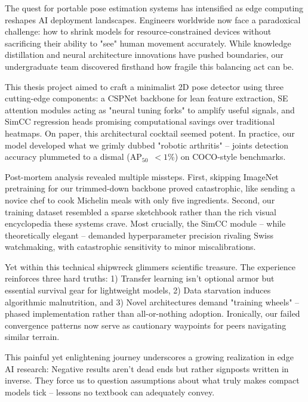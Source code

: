 The quest for portable pose estimation systems has intensified as edge computing reshapes AI deployment landscapes. Engineers worldwide now face a paradoxical challenge: how to shrink models for resource-constrained devices without sacrificing their ability to "see" human movement accurately. While knowledge distillation and neural architecture innovations have pushed boundaries, our undergraduate team discovered firsthand how fragile this balancing act can be.

This thesis project aimed to craft a minimalist 2D pose detector using three cutting-edge components: a CSPNet backbone for lean feature extraction, SE attention modules acting as "neural tuning forks" to amplify useful signals, and SimCC regression heads promising computational savings over traditional heatmaps. On paper, this architectural cocktail seemed potent. In practice, our model developed what we grimly dubbed "robotic arthritis" – joints detection accuracy plummeted to a dismal (AP$_{50}$~$<1\%$) on COCO-style benchmarks.

Post-mortem analysis revealed multiple missteps. First, skipping ImageNet pretraining for our trimmed-down backbone proved catastrophic, like sending a novice chef to cook Michelin meals with only five ingredients. Second, our training dataset resembled a sparse sketchbook rather than the rich visual encyclopedia these systems crave. Most crucially, the SimCC module – while theoretically elegant – demanded hyperparameter precision rivaling Swiss watchmaking, with catastrophic sensitivity to minor miscalibrations.

Yet within this technical shipwreck glimmers scientific treasure. The experience reinforces three hard truths: 1) Transfer learning isn’t optional armor but essential survival gear for lightweight models, 2) Data starvation induces algorithmic malnutrition, and 3) Novel architectures demand "training wheels" – phased implementation rather than all-or-nothing adoption. Ironically, our failed convergence patterns now serve as cautionary waypoints for peers navigating similar terrain.

This painful yet enlightening journey underscores a growing realization in edge AI research: Negative results aren’t dead ends but rather signposts written in inverse. They force us to question assumptions about what truly makes compact models tick – lessons no textbook can adequately convey.